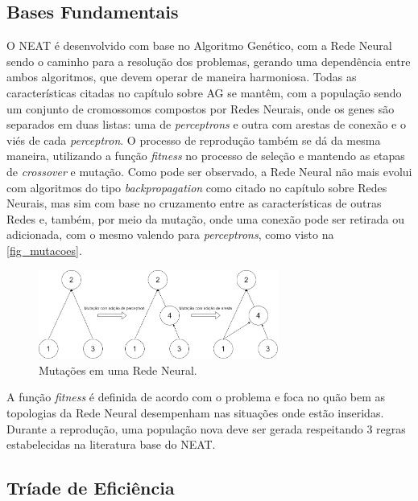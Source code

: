 \subsection{Bases Fundamentais}

O NEAT é desenvolvido com base no Algoritmo Genético, com a Rede Neural 
sendo o caminho para a resolução dos problemas, gerando uma dependência entre 
ambos algoritmos, que devem operar de maneira harmoniosa. Todas as 
características citadas no capítulo sobre AG se mantêm, com a população sendo 
um conjunto de cromossomos compostos por Redes Neurais, onde os genes são 
separados em duas listas: uma de \textit{perceptrons} e outra com arestas de conexão e o 
viés de cada \textit{perceptron}. O processo de reprodução também se dá da mesma 
maneira, utilizando a função \textit{fitness} no processo de seleção e mantendo as etapas 
de \textit{crossover} e mutação. Como pode ser observado, a Rede Neural não mais evolui 
com algoritmos do tipo \textit{backpropagation} como citado no capítulo sobre Redes 
Neurais, mas sim com base no cruzamento entre as características de outras Redes 
e, também, por meio da mutação, onde uma conexão pode ser retirada 
ou adicionada, com o mesmo valendo para \textit{perceptrons}, como visto na \autoref{fig_mutacoes}.

\begin{figure}[htb]
        \centering
        \caption{\label{fig_mutacoes}Muta{\c c}{\~o}es em uma Rede Neural.}
        \includegraphics[width=0.7\textwidth]{images/MutaçãoDeTopologias.png}
\end{figure}

A função \textit{fitness} é definida de acordo com o problema e foca no quão bem as 
topologias da Rede Neural desempenham nas situações onde estão inseridas. 
Durante a reprodução, uma população nova deve ser gerada respeitando 3 regras 
estabelecidas na literatura base do NEAT.

\subsection{Tr{\'i}ade de Efici{\^e}ncia}

